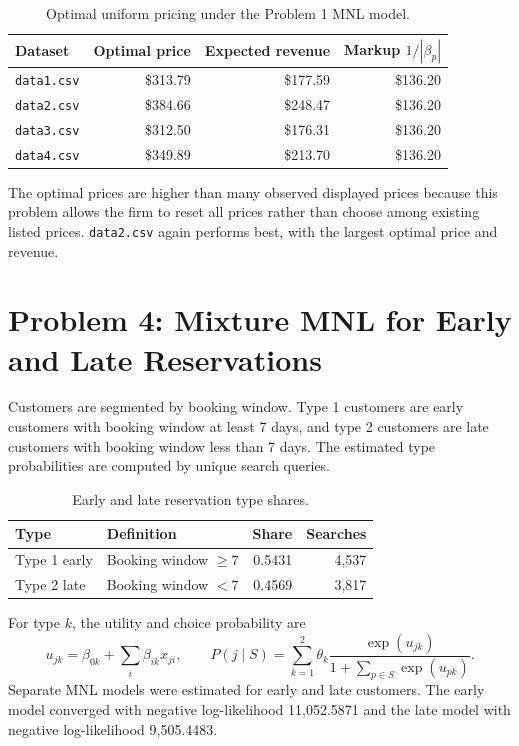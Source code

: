 \documentclass[11pt]{article}
\begin{document}
\begin{table}[H]
\centering
\caption{Optimal uniform pricing under the Problem 1 MNL model.}
\begin{tabular}{lrrr}
\toprule
Dataset & Optimal price & Expected revenue & Markup $1/|\beta_p|$ \\
\midrule
\texttt{data1.csv} & \$313.79 & \$177.59 & \$136.20 \\
\texttt{data2.csv} & \$384.66 & \$248.47 & \$136.20 \\
\texttt{data3.csv} & \$312.50 & \$176.31 & \$136.20 \\
\texttt{data4.csv} & \$349.89 & \$213.70 & \$136.20 \\
\bottomrule
\end{tabular}
\end{table}

The optimal prices are higher than many observed displayed prices because this problem allows the firm to reset all prices rather than choose among existing listed prices. \texttt{data2.csv} again performs best, with the largest optimal price and revenue.

\section{Problem 4: Mixture MNL for Early and Late Reservations}

Customers are segmented by booking window. Type 1 customers are early customers with booking window at least 7 days, and type 2 customers are late customers with booking window less than 7 days. The estimated type probabilities are computed by unique search queries.

\begin{table}[H]
\centering
\caption{Early and late reservation type shares.}
\begin{tabular}{llrr}
\toprule
Type & Definition & Share & Searches \\
\midrule
Type 1 early & Booking window $\geq 7$ & 0.5431 & 4,537 \\
Type 2 late & Booking window $< 7$ & 0.4569 & 3,817 \\
\bottomrule
\end{tabular}
\end{table}

For type $k$, the utility and choice probability are
\[
u_{jk} = \beta_{0k} + \sum_i \beta_{ik} x_{ji},
\qquad
P(j \mid S) = \sum_{k=1}^2 \theta_k
\frac{\exp(u_{jk})}{1+\sum_{p \in S}\exp(u_{pk})}.
\]
Separate MNL models were estimated for early and late customers. The early model converged with negative log-likelihood 11,052.5871 and the late model with negative log-likelihood 9,505.4483.
\end{document}
